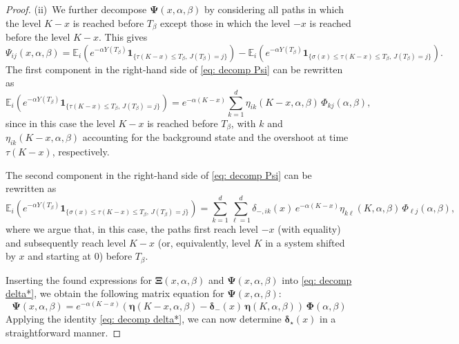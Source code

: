 \documentclass[reqno,12pt]{amsart}
\newcommand{\bs}{\boldsymbol}
\begin{document}
\begin{proof}
\medskip
(ii)~We further decompose ${\bs \Psi}(x,\alpha,\beta)$ by considering all paths in which the level $K-x$ is reached before $T_{\beta}$ except those in which the level $-x$ is reached before the level $K-x$. This gives
\begin{equation}\label{eq: decomp Psi}
    {\Psi}_{ij}(x,\alpha,\beta) = {\mathbb E}_i\left(e^{-\alpha Y(T_{\beta})}{\bs 1}_{\{\tau(K-x)\leqslant T_{\beta},\,J(T_{\beta})=j\}}\right) - {\mathbb E}_i\left(e^{-\alpha Y(T_{\beta})}{\bs 1}_{\{\sigma(x)\leqslant\tau(K-x)\leqslant T_{\beta},\,J(T_{\beta})=j\}}\right).
\end{equation}
The first component in the right-hand side of \eqref{eq: decomp Psi} can be rewritten as 
\begin{equation*}
    {\mathbb E}_i\left(e^{-\alpha Y(T_{\beta})}{\bs 1}_{\{\tau(K-x)\leqslant T_{\beta},\,J(T_{\beta})=j\}}\right) = e^{-\alpha(K-x)}\sum_{k=1}^d  \eta_{ik}(K-x, \alpha, \beta)\,\Phi_{kj}(\alpha,\beta),
\end{equation*}
since in this case the level $K-x$ is reached before $T_{\beta}$, with $k$ and $\eta_{ik}(K-x,\alpha,\beta)$ accounting for the background state and the overshoot at time $\tau(K-x)$, respectively.

The second component in the right-hand side of \eqref{eq: decomp Psi} can be rewritten as
\begin{equation*}
        {\mathbb E}_i\left(e^{-\alpha Y(T_{\beta})}{\bs 1}_{\{\sigma(x)\leqslant\tau(K-x)\leqslant T_{\beta},\,J(T_{\beta})=j\}}\right) = \sum_{k=1}^d\sum_{\ell=1}^d\delta_{-,ik}(x)\,e^{-\alpha(K-x)}\eta_{k\ell}(K,\alpha,\beta)\,\Phi_{\ell j}(\alpha,\beta),
    \end{equation*}
where we argue that, in this case, the paths first reach level $-x$ (with equality) and subsequently reach level $K-x$ (or, equivalently, level $K$ in a system shifted by $x$ and starting at $0$) before $T_{\beta}$.

\medskip

Inserting the found expressions for ${\bs \Xi}(x,\alpha,\beta)$ and ${\bs \Psi}(x,\alpha,\beta)$ into \eqref{eq: decomp delta*}, we obtain the following matrix equation for $\bs{\Psi}(x,\alpha,\beta)$:
\begin{equation*}
    {\bs \Psi}(x,\alpha,\beta) = e^{-\alpha(K-x)}\left(\bs{\eta}(K-x, \alpha, \beta) - \bs{\delta}_{-}(x)\,\bs{\eta}(K,\alpha,\beta)\right)\,\bs{\Phi}(\alpha,\beta)
\end{equation*}
Applying the identity \eqref{eq: decomp delta*}, we can now determine $\bs\delta_{\star}(x)$ in a straightforward manner.
\end{proof}
\end{document}
